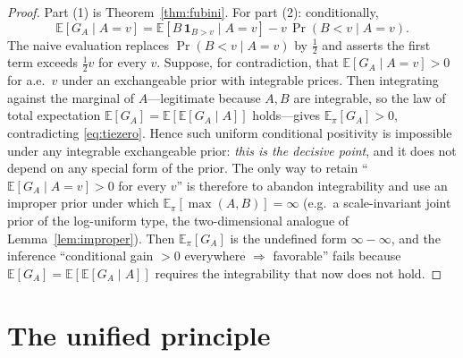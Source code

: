 \documentclass{amsart}
\theoremstyle{plain}
\theoremstyle{definition}
\begin{document}
\begin{proof}
Part (1) is Theorem~\ref{thm:fubini}. For part (2): conditionally,
\[
\mathbb E[G_A\mid A=v]
=\mathbb E[B\,\mathbf 1_{B>v}\mid A=v]-v\,\Pr(B<v\mid A=v).
\]
The naive evaluation replaces $\Pr(B<v\mid A=v)$ by $\tfrac12$ and asserts the
first term exceeds $\tfrac12 v$ for every $v$. Suppose, for contradiction, that
$\mathbb E[G_A\mid A=v]>0$ for a.e.\ $v$ under an exchangeable prior with
integrable prices. Then integrating against the marginal of $A$---legitimate
because $A,B$ are integrable, so the law of total expectation
$\mathbb E[G_A]=\mathbb E[\mathbb E[G_A\mid A]]$ holds---gives
$\mathbb E_\pi[G_A]>0$, contradicting \eqref{eq:tiezero}. Hence such uniform
conditional positivity is impossible under any integrable exchangeable prior:
\emph{this is the decisive point}, and it does not depend on any special form of
the prior. The only way to retain ``$\mathbb E[G_A\mid A=v]>0$ for every $v$''
is therefore to abandon integrability and use an improper prior under which
$\mathbb E_\pi[\max(A,B)]=\infty$ (e.g.\ a scale-invariant joint prior of the
log-uniform type, the two-dimensional analogue of Lemma~\ref{lem:improper}).
Then $\mathbb E_\pi[G_A]$ is the undefined form $\infty-\infty$, and the
inference ``conditional gain $>0$ everywhere $\Rightarrow$ favorable'' fails
because $\mathbb E[G_A]=\mathbb E[\mathbb E[G_A\mid A]]$ requires the integrability that
now does not hold.
\end{proof}

\section{The unified principle}
\end{document}
